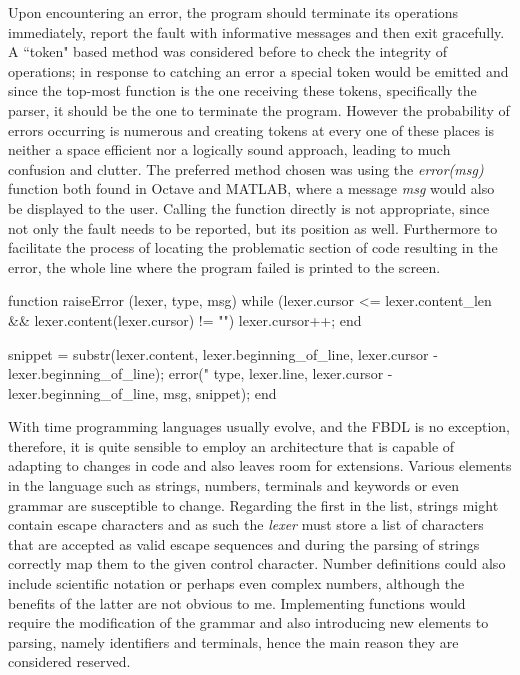 Upon encountering an error, the program should terminate its operations immediately, report the fault with informative messages and then exit gracefully. A ``token" based method was considered before to check the integrity of operations; in response to catching an error a special token would be emitted and since the top-most function is the one receiving these tokens, specifically the parser, it should be the one to terminate the program. However the probability of errors occurring is numerous and creating tokens at every one of these places is neither a space efficient nor a logically sound approach, leading to much confusion and clutter. The preferred method chosen was using the \textit{error(msg)} function both found in Octave and MATLAB, where a message \textit{msg} would also be displayed to the user. Calling the function directly is not appropriate, since not only the fault needs to be reported, but its position as well. Furthermore to facilitate the process of locating the problematic section of code resulting in the error, the whole line where the program failed is printed to the screen.

\begin{octave}
function raiseError (lexer, type, msg)
  while (lexer.cursor <= lexer.content_len &&
       lexer.content(lexer.cursor) != "\n")
    lexer.cursor++;
  end

  snippet = substr(lexer.content,
  lexer.beginning_of_line, lexer.cursor - lexer.beginning_of_line);
  error("%
    type, lexer.line, lexer.cursor - lexer.beginning_of_line,
    msg, snippet);
end
\end{octave}


With time programming languages usually evolve, and the FBDL is no exception, therefore, it is quite sensible to employ an architecture that is capable of adapting to changes in code and also leaves room for extensions. Various elements in the language such as strings, numbers, terminals and keywords or even grammar are susceptible to change. Regarding the first in the list, strings might contain escape characters and as such the \textit{lexer} must store a list of characters that are accepted as valid escape sequences and during the parsing of strings correctly map them to the given control character. Number definitions could also include scientific notation or perhaps even complex numbers, although the benefits of the latter are not obvious to me. Implementing functions would require the modification of the grammar and also introducing new elements to parsing, namely identifiers and terminals, hence the main reason they are considered reserved.

